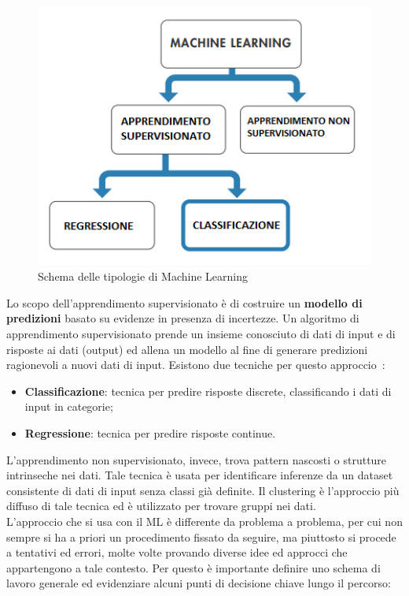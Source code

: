 \begin{figure}[]
	\centering
	\includegraphics[width=1\textwidth]{images/Tipologie_Machine_Learning.png}
	\caption{Schema delle tipologie di Machine Learning}
\end{figure}
Lo scopo dell'apprendimento supervisionato è di costruire un \textbf{modello di predizioni} basato su evidenze in presenza di incertezze. Un algoritmo di apprendimento supervisionato prende un insieme conosciuto di dati di input e di risposte ai dati (output) ed allena un modello al fine di generare predizioni ragionevoli a nuovi dati di input. Esistono due tecniche per questo approccio~\cite{10}:
\begin{itemize}
	\item \textbf{Classificazione}: tecnica per predire risposte discrete, classificando i dati di input in categorie;
	\item \textbf{Regressione}: tecnica per predire risposte continue.
\end{itemize}
L'apprendimento non supervisionato, invece, trova pattern nascosti o strutture intrinseche nei dati. Tale tecnica è usata per identificare inferenze da un dataset consistente di dati di input senza classi già definite. Il clustering è l'approccio più diffuso di tale tecnica ed è utilizzato per trovare gruppi nei dati.\\
L'approccio che si usa con il ML è differente da problema a problema, per cui non sempre si ha a priori un procedimento fissato da seguire, ma piuttosto si procede a tentativi ed errori, molte volte provando diverse idee ed approcci che appartengono a tale contesto. Per questo è importante definire uno schema di lavoro generale ed evidenziare alcuni punti di decisione chiave lungo il percorso:
